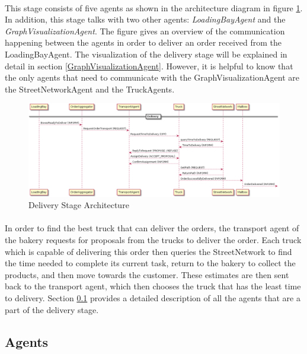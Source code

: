 \documentclass[11pt, a4paper]{article}
\begin{document}
\paragraph{}
This stage consists of five agents as shown in the architecture diagram in figure \ref{DeliveryArchitecture}. In addition, this stage talks with two other agents: \textit{LoadingBayAgent} and the \textit{GraphVisualizationAgent}. The figure gives an overview of the communication happening between the agents in order to deliver an order received from the LoadingBayAgent. The visualization of the delivery stage will be explained in detail in section \ref{GraphVisualizationAgent}. However, it is helpful to know that the only agents that need to communicate with the GraphVisualizationAgent are the StreetNetworkAgent and the TruckAgents. 

\begin{figure}[h!]
	\centering
	\includegraphics[width=\textwidth]{../Architecture/Architecture_Delivery.png}
	\caption{Delivery Stage Architecture}
	\label{DeliveryArchitecture}
\end{figure}

\paragraph{}
In order to find the best truck that can deliver the orders, the transport agent of the bakery requests for proposals from the trucks to deliver the order. Each truck which is capable of delivering this order then queries the StreetNetwork to find the time needed to complete its current task, return to the bakery to collect the products, and then move towards the customer. These estimates are then sent back to the transport agent, which then chooses the truck that has the least time to delivery.  Section \ref{DeliveryAgents} provides a detailed description of all the agents that are a part of the delivery stage.

\subsection{Agents}\label{DeliveryAgents}
\end{document}
